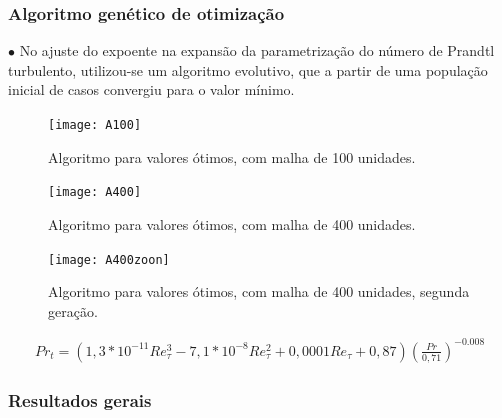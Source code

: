 \documentclass[xcolor=dvipsnames,10pt,aspectratio=169]{beamer}
\begin{document}
	
	
	
			\begin{frame}
	\frametitle{Algoritmo genético de otimização}
	$\bullet$ No ajuste do expoente na expansão da parametrização do número de Prandtl turbulento, utilizou-se um algoritmo evolutivo, que a partir de uma população inicial de casos convergiu para o valor mínimo.\\ 
	\begin{minipage}[h!]{0.24\textwidth}
		\begin{figure}
			\centering
			\texttt{[image: A100]}
			\caption{Algoritmo para valores ótimos, com malha de 100 unidades.}
		\end{figure}
	\end{minipage}\hfill
	\begin{minipage}[h!]{0.24\textwidth}
		\begin{figure}
			\centering
			\texttt{[image: A400]}
			\caption{Algoritmo para valores ótimos, com malha de 400 unidades.}
		\end{figure}
	\end{minipage}\hfill
\begin{minipage}[h!]{0.24\textwidth}
	\begin{figure}
		\centering
		\texttt{[image: A400zoon]}
		\caption{Algoritmo para valores ótimos, com malha de 400 unidades, segunda geração.}
	\end{figure}
\end{minipage}	
	\begin{equation}
\begin{split}
Pr_t = \left( 1,3 * 10^{-11} Re_\tau^3 - 7,1 * 10^{-8} Re_\tau^2 + 0,0001 Re_\tau + 0,87 \right) \left(  \frac{Pr}{0,71}\right) ^{-0.008}
\end{split}
\end{equation}	
\end{frame}	
	
	
	
	
	
	
	
		\begin{frame}
		\frametitle{Resultados gerais}
		\begin{minipage}[h!]{0.45\textwidth}
		\end{minipage}\hfill
		\end{frame}
	
	
	
	
	
\end{document}
